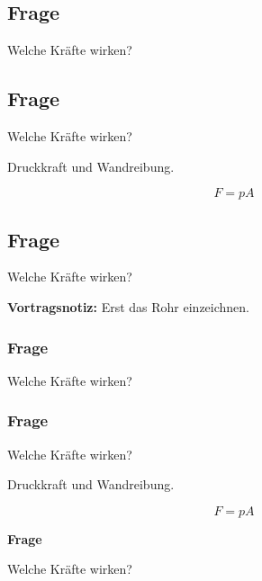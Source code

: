\subsection{Frage}


Welche Kräfte wirken?



\subsection{Frage}


Welche Kräfte wirken?


Druckkraft und Wandreibung.

\[
F = pA
\]



\subsection{Frage}


Welche Kräfte wirken?



\par{}\par

\par\noindent\textbf{Vortragsnotiz:} Erst das Rohr einzeichnen.\par

\begin{frame}[t]
\frametitle{Frage}


Welche Kräfte wirken?



\end{frame}

\begin{frame}[t]
\frametitle{Frage}


Welche Kräfte wirken?


Druckkraft und Wandreibung.

\[
F = pA
\]



\end{frame}

\begin{frame}[t]
\par\medskip\noindent\textbf{Frage}\par



Welche Kräfte wirken?



\end{frame}

